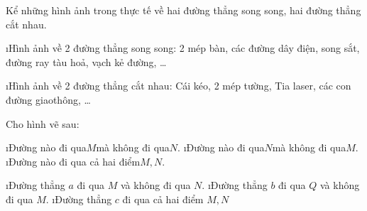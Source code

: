 \begin{bt}
	Kể những hình ảnh trong thực tế về hai đường thẳng song song, hai đường thẳng cắt nhau.
	\begin{loigiaichuong28}
		\begin{enumerate}[--,leftmargin=*]
			\i Hình ảnh về 2 đường thẳng song song: 2 mép bàn, các đường dây điện, song sắt, đường ray tàu hoả, vạch kẻ đường, \ldots
			\begin{center}
			\end{center}
		\i Hình ảnh về 2 đường thẳng cắt nhau: Cái kéo, 2 mép tường, Tia laser, các con đường giao\linebreak thông, \ldots
		\begin{center}
		\end{center}
		\end{enumerate}
	\end{loigiaichuong28}
\end{bt}
\begin{bt} %
	Cho hình vẽ sau: 
	\begin{enumerate}[a),leftmargin=*]
		\i Đường nào đi qua$M$mà không đi qua$N$.
		\i Đường nào đi qua$N$mà không đi qua$M$.
		\i Đường nào đi qua cả hai điểm$M,N$.
	\end{enumerate}
	\begin{loigiaichuong28}
		\begin{enumerate}[a),leftmargin=*]
			\i Đường thẳng  $a$ đi qua $M$ và không đi qua $N$. 
			\i Đường thẳng $b$ đi qua $Q$  và không đi qua $M$. 
			\i Đường thẳng $c$ đi qua cả hai điểm $M,N$
		\end{enumerate}
	\end{loigiaichuong28}
\end{bt}
